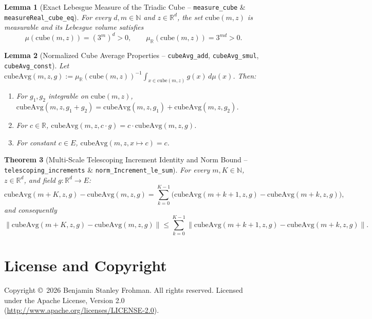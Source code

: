 \documentclass[11pt]{article}
\newtheorem{theorem}{Theorem}
\newtheorem{lemma}[theorem]{Lemma}
\begin{document}
\begin{lemma}[Exact Lebesgue Measure of the Triadic Cube -- \texttt{measure\_cube} \& \texttt{measureReal\_cube\_eq}]
For every $d, m \in \mathbb{N}$ and $z \in \mathbb{R}^d$, the set $\mathrm{cube}(m,z)$ is measurable and its Lebesgue volume satisfies
\[
\mu(\mathrm{cube}(m,z)) = (3^m)^d > 0, \qquad \mu_{\mathbb{R}}(\mathrm{cube}(m,z)) = 3^{md} > 0.
\]
\end{lemma}

\begin{lemma}[Normalized Cube Average Properties -- \texttt{cubeAvg\_add}, \texttt{cubeAvg\_smul}, \texttt{cubeAvg\_const}]
Let $\mathrm{cubeAvg}(m,z,g) := \mu_{\mathbb{R}}(\mathrm{cube}(m,z))^{-1} \int_{x \in \mathrm{cube}(m,z)} g(x)\,d\mu(x)$. Then:
\begin{enumerate}
  \item For $g_1, g_2$ integrable on $\mathrm{cube}(m,z)$, $\mathrm{cubeAvg}(m,z,g_1 + g_2) = \mathrm{cubeAvg}(m,z,g_1) + \mathrm{cubeAvg}(m,z,g_2)$.
  \item For $c \in \mathbb{R}$, $\mathrm{cubeAvg}(m,z, c \cdot g) = c \cdot \mathrm{cubeAvg}(m,z,g)$.
  \item For constant $c \in E$, $\mathrm{cubeAvg}(m,z, x \mapsto c) = c$.
\end{enumerate}
\end{lemma}

\begin{theorem}[Multi-Scale Telescoping Increment Identity and Norm Bound -- \texttt{telescoping\_increments} \& \texttt{norm\_Increment\_le\_sum}]
For every $m, K \in \mathbb{N}$, $z \in \mathbb{R}^d$, and field $g : \mathbb{R}^d \to E$:
\[
\mathrm{cubeAvg}(m+K,z,g) - \mathrm{cubeAvg}(m,z,g) = \sum_{k=0}^{K-1} \bigl(\mathrm{cubeAvg}(m+k+1,z,g) - \mathrm{cubeAvg}(m+k,z,g)\bigr),
\]
and consequently
\[
\bigl\|\mathrm{cubeAvg}(m+K,z,g) - \mathrm{cubeAvg}(m,z,g)\bigr\| \le \sum_{k=0}^{K-1} \bigl\|\mathrm{cubeAvg}(m+k+1,z,g) - \mathrm{cubeAvg}(m+k,z,g)\bigr\|.
\]
\end{theorem}

\section*{License and Copyright}
Copyright \copyright\ 2026 Benjamin Stanley Frohman. All rights reserved. Licensed under the Apache License, Version 2.0 (\url{http://www.apache.org/licenses/LICENSE-2.0}).
\end{document}
